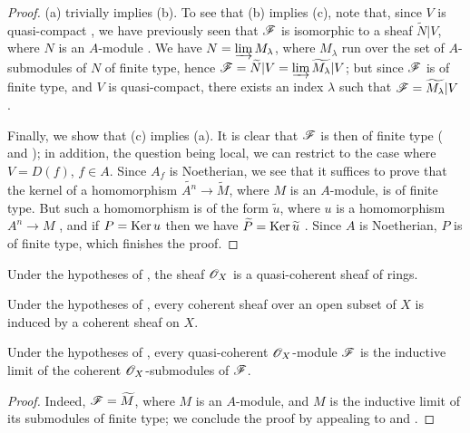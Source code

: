 \begin{proof}
\label{proof-I.1.5.1}
(a) trivially implies (b).
To see that (b) implies (c), note that, since $V$ is quasi-compact , we have previously seen that $\mathscr{F}$ is isomorphic to a sheaf $\widetilde{N}|V$, where $N$ is an $A$-module .
We have $N=\varinjlim M_\lambda$, where $M_\lambda$ run over the set of $A$-submodules of $N$ of finite type, hence  $\mathscr{F}=\widetilde{N}|V=\varinjlim\widetilde{M_\lambda}|V$;
but since $\mathscr{F}$ is of finite type, and $V$ is quasi-compact, there exists an index $\lambda$ such that $\mathscr{F}=\widetilde{M_\lambda}|V$ .

Finally, we show that (c) implies (a).
It is clear that $\mathscr{F}$ is then of finite type ( and );
in addition, the question being local, we can restrict to the case where $V=D(f)$, $f\in A$.
Since $A_f$ is Noetherian, we see that it suffices to prove that the kernel of a homomorphism $\widetilde{A^n}\to\widetilde{M}$, where $M$ is an $A$-module, is of finite type.
But such a homomorphism is of the form $\widetilde{u}$, where $u$ is a homomorphism $A^n\to M$ , and if $P=\operatorname{Ker} u$ then we have $\widetilde{P}=\operatorname{Ker}\widetilde{u}$ .
Since $A$ is Noetherian, $P$ is of finite type, which finishes the proof.
\end{proof}

\begin{corollary}[1.5.2]
\label{I.1.5.2}
Under the hypotheses of , the sheaf $\mathscr{O}_X$ is a quasi-coherent sheaf of rings.
\end{corollary}

\begin{corollary}[1.5.3]
\label{I.1.5.3}
Under the hypotheses of , every coherent sheaf over an open subset of $X$ is induced by a coherent sheaf on $X$.
\end{corollary}

\begin{corollary}[1.5.4]
\label{I.1.5.4}
Under the hypotheses of , every quasi-coherent $\mathscr{O}_X$-module $\mathscr{F}$ is the inductive limit of the coherent $\mathscr{O}_X$-submodules of $\mathscr{F}$.
\end{corollary}

\begin{proof}
\label{proof-I.1.5.4}
Indeed, $\mathscr{F}=\widetilde{M}$, where $M$ is an $A$-module, and $M$ is the inductive limit of its submodules of finite type;
we conclude the proof by appealing to  and .
\end{proof}

